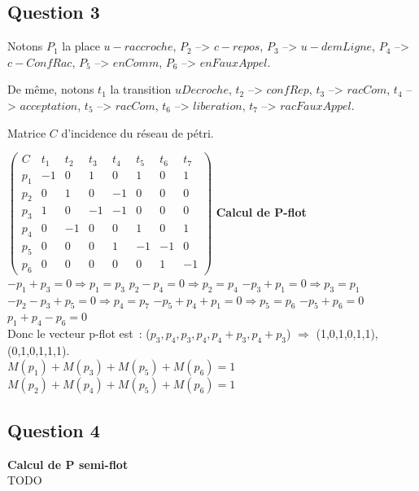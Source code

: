 \subsection*{Question 3}

Notons $P_1$ la place $u-raccroche$, $P_2$ --> $c-repos$, $P_3$ -->
$u-demLigne$, $P_4$ --> $c-ConfRac$, $P_5$ --> $enComm$, $P_6$ -->
$enFauxAppel$.

De même, notons $t_1$ la transition $uDecroche$, $t_2$ --> $confRep$,
$t_3$ --> $racCom$, $t_4$ --> $acceptation$, $t_5$ --> $racCom$, $t_6$
--> $liberation$, $t_7$ --> $racFauxAppel$.

Matrice $C$ d'incidence du réseau de pétri.  

 $ \begin{pmatrix}
C&t_1&t_2&t_3&t_4&t_5&t_6&t_7 \\
p_1& -1&0&1&0&1&0&1 \\
p_2&0&1&0&-1&0&0&0 \\
p_3&1&0&-1&-1&0&0&0 \\
p_4&0&-1&0&0&1&0&1 \\
p_5&0&0&0&1&-1&-1&0 \\
p_6&0&0&0&0&0&1&-1
\end{pmatrix}$
\textbf{Calcul de P-flot}\\
$-p_1 + p_3=0 \Rightarrow p_1=p_3$
$p_2 - p_4=0 \Rightarrow p_2=p_4$
$-p_3 + p_1=0 \Rightarrow p_3=p_1$
$-p_2 - p_3 + p_5=0 \Rightarrow p_4=p_7$
$-p_5 + p_4 + p_1=0 \Rightarrow p_5=p_6$
$-p_5 + p_6=0$
$ p_1 + p_4 - p_6=0$\\
Donc le vecteur p-flot est~: ($p_3,p_4,p_3,p_4,p_4 + p_3,p_4 + p_3$) $\Rightarrow$ (1,0,1,0,1,1),(0,1,0,1,1,1).\\
$M(p_1)+M(p_3)+M(p_5)+M(p_6)=1$
$M(p_2)+M(p_4)+M(p_5)+M(p_6)=1$
\subsection*{Question 4}
\textbf{Calcul de P semi-flot}\\


TODO
